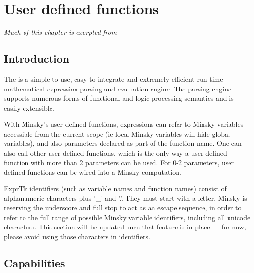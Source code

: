 
\chapter{User defined functions}

\label{ExprTk}

{\em Much of this chapter is exerpted from }

\section{Introduction}

The 
is a simple to use, easy to integrate and extremely efficient run-time
mathematical expression parsing and evaluation engine. The parsing
engine supports numerous forms of functional and logic processing
semantics and is easily extensible.

With Minsky's user defined functions, expressions can refer to Minsky
variables accessible from the current scope (ie local Minsky variables
will hide global variables), and also parameters declared as part
of the function name. One can also call other user defined functions,
which is the only way a user defined function with more than 2 parameters
can be used. For 0-2 parameters, user defined functions can be wired
into a Minsky computation.

ExprTk identifiers (such as variable names and function names) consist
of alphanumeric characters plus '\_' and '.'. They must start with
a letter. Minsky is reserving the underscore and full stop to act
as an escape sequence, in order to refer to the full range of possible
Minsky variable identifiers, including all unicode characters. This
section will be updated once that feature is in place --- for now,
please avoid using those characters in identifiers.

\section{Capabilities}

